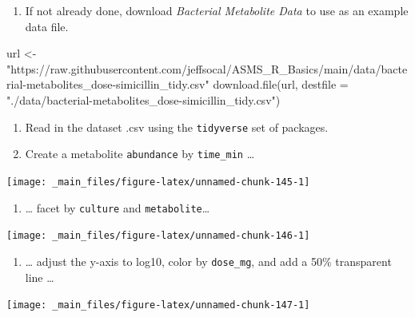 \documentclass[
]{book}
\newenvironment{Shaded}{\begin{snugshade}}{\end{snugshade}}
\newcommand{\AttributeTok}[1]{\textcolor[rgb]{0.77,0.63,0.00}{#1}}
\newcommand{\FunctionTok}[1]{\textcolor[rgb]{0.00,0.00,0.00}{#1}}
\newcommand{\NormalTok}[1]{#1}
\newcommand{\OtherTok}[1]{\textcolor[rgb]{0.56,0.35,0.01}{#1}}
\newcommand{\StringTok}[1]{\textcolor[rgb]{0.31,0.60,0.02}{#1}}
\providecommand{\tightlist}{%
  \setlength{\itemsep}{0pt}\setlength{\parskip}{0pt}}
\begin{document}
\begin{enumerate}
\def\labelenumi{\arabic{enumi}.}
\tightlist
\item
  If not already done, download \emph{Bacterial Metabolite Data} to use as an example data file.
\end{enumerate}

\begin{Shaded}
\begin{Highlighting}[]
\NormalTok{url }\OtherTok{\textless{}{-}} \StringTok{"https://raw.githubusercontent.com/jeffsocal/ASMS\_R\_Basics/main/data/bacterial{-}metabolites\_dose{-}simicillin\_tidy.csv"}
\FunctionTok{download.file}\NormalTok{(url, }\AttributeTok{destfile =} \StringTok{"./data/bacterial{-}metabolites\_dose{-}simicillin\_tidy.csv"}\NormalTok{)}
\end{Highlighting}
\end{Shaded}

\begin{enumerate}
\def\labelenumi{\arabic{enumi}.}
\setcounter{enumi}{1}
\item
  Read in the dataset .csv using the \texttt{tidyverse} set of packages.
\item
  Create a metabolite \texttt{abundance} by \texttt{time\_min} \ldots{}
\end{enumerate}

\begin{center}\texttt{[image: \_main\_files/figure-latex/unnamed-chunk-145-1]} \end{center}

\begin{enumerate}
\def\labelenumi{\arabic{enumi}.}
\setcounter{enumi}{3}
\tightlist
\item
  \ldots{} facet by \texttt{culture} and \texttt{metabolite}\ldots{}
\end{enumerate}

\begin{center}\texttt{[image: \_main\_files/figure-latex/unnamed-chunk-146-1]} \end{center}

\begin{enumerate}
\def\labelenumi{\arabic{enumi}.}
\setcounter{enumi}{3}
\tightlist
\item
  \ldots{} adjust the y-axis to log10, color by \texttt{dose\_mg}, and add a 50\% transparent line \ldots{}
\end{enumerate}

\begin{center}\texttt{[image: \_main\_files/figure-latex/unnamed-chunk-147-1]} \end{center}
\end{document}
